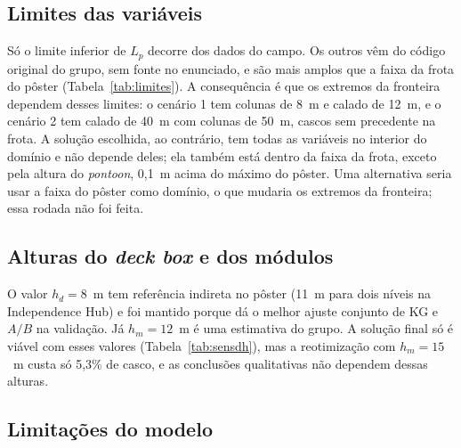 \documentclass[11pt,a4paper]{article}
\begin{document}
\subsection{Limites das variáveis}\label{sec:disc-limites}

Só o limite inferior de $L_p$ decorre dos dados do campo. Os outros vêm do código original do grupo,
sem fonte no enunciado, e são mais amplos que a faixa da frota do pôster (Tabela~\ref{tab:limites}).
A consequência é que os extremos da fronteira dependem desses limites: o cenário 1 tem colunas de
8~m e calado de 12~m, e o cenário 2 tem calado de 40~m com colunas de 50~m, cascos sem precedente na
frota. A solução escolhida, ao contrário, tem todas as variáveis no interior do domínio e não depende
deles; ela também está dentro da faixa da frota, exceto pela altura do \emph{pontoon}, 0,1~m acima
do máximo do pôster. Uma alternativa seria usar a faixa do pôster como domínio, o que mudaria os
extremos da fronteira; essa rodada não foi feita.

\subsection{Alturas do \emph{deck box} e dos módulos}

O valor $h_d = 8$~m tem referência indireta no pôster (11~m para dois níveis na Independence Hub) e
foi mantido porque dá o melhor ajuste conjunto de KG e $A/B$ na validação. Já $h_m = 12$~m é uma
estimativa do grupo. A solução final só é viável com esses valores (Tabela~\ref{tab:sensdh}), mas a
reotimização com $h_m = 15$~m custa só 5,3\% de casco, e as conclusões qualitativas não dependem
dessas alturas.

\subsection{Limitações do modelo}\label{sec:disc-limitacoes}
\end{document}
